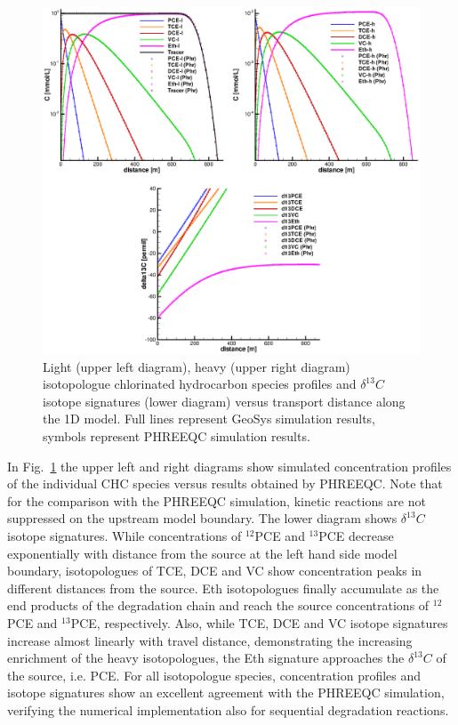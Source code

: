 \begin{figure}[htbp]
\centering
\includegraphics[width=1\textwidth]{PART_III/HC/Fig_isofrac_prof.eps}
\caption{Light (upper left diagram), heavy (upper right diagram) isotopologue chlorinated hydrocarbon species profiles and $\delta^{13}C$ isotope signatures (lower diagram) versus transport distance along the 1D model. Full lines represent GeoSys simulation results, symbols represent PHREEQC simulation results.}
\label{profiles_isofrac_C}
\end{figure}

In Fig.~\ref{profiles_isofrac_C} the upper left and right diagrams show simulated concentration profiles of the individual CHC species versus results obtained by PHREEQC. Note that for the comparison with the PHREEQC simulation, kinetic reactions are not suppressed on the upstream model boundary. The lower diagram shows $\delta^{13}C$ isotope signatures. While concentrations of $^{12}$PCE and $^{13}$PCE decrease exponentially with distance from the source at the left hand side model boundary, isotopologues of TCE, DCE and VC show concentration peaks in different distances from the source. Eth isotopologues finally accumulate as the end products of the degradation chain and reach the source concentrations of $^{12}$PCE and $^{13}$PCE, respectively. Also, while TCE, DCE and VC isotope signatures increase almost linearly with travel distance, demonstrating the increasing enrichment of the heavy isotopologues, the Eth signature approaches the $\delta^{13}C$ of the source, i.e. PCE. For all isotopologue species, concentration profiles and isotope signatures show an excellent agreement with the PHREEQC simulation, verifying the numerical implementation also for sequential degradation reactions.
